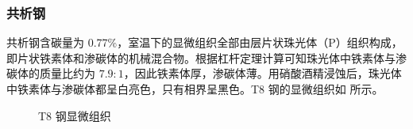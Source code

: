     \subsubsection{共析钢}
    共析钢含碳量为 0.77\%，室温下的显微组织全部由层片状珠光体（P）组织构成，即片状铁素体和渗碳体的机械混合物。根据杠杆定理计算可知珠光体中铁素体与渗碳体的质量比约为 $7.9:1$，因此铁素体厚，渗碳体薄。用硝酸酒精浸蚀后，珠光体中铁素体与渗碳体都呈白亮色，只有相界呈黑色。T8 钢的显微组织如 所示。
    \begin{figure}[!ht]
        \hspace{20pt}
        \hspace{20pt}
        \caption{T8 钢显微组织\label{fig:n3}}
    \end{figure}

